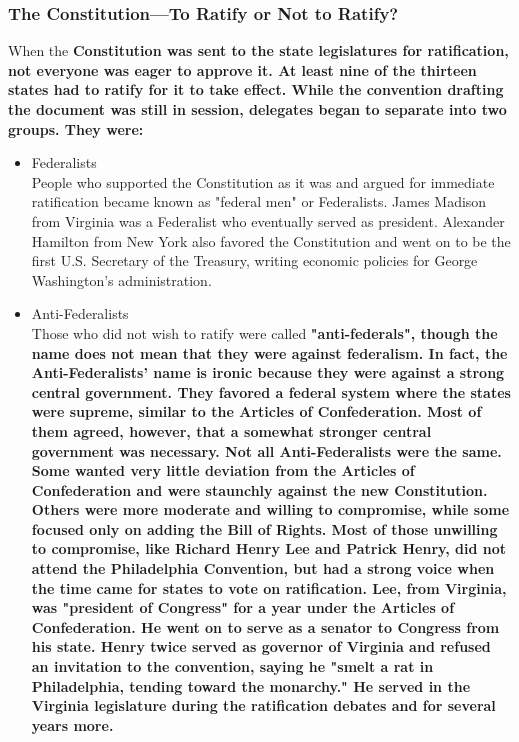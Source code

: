 
\subsubsection*{The Constitution—To Ratify or Not to Ratify?}

When the \bf{Constitution} was sent to the state legislatures for
ratification, not everyone was eager to approve it.  At least nine of the
thirteen states had to ratify for it to take effect. While the convention
drafting the document was still in session, delegates began to separate into two
groups. They were:

\begin{itemize}
    \item Federalists \\
        People who supported the Constitution as it was and argued for immediate
        ratification became known as "federal men" or Federalists. James Madison
        from Virginia was a Federalist who eventually served as president.
        Alexander Hamilton from New York also favored the Constitution and went
        on to be the first U.S. Secretary of the Treasury, writing economic
        policies for George Washington's administration.
    \item Anti-Federalists \\
        Those who did not wish to ratify were called \bf{"anti-federals"}, though the
        name does not mean that they were against federalism. In fact, the
        Anti-Federalists' name is ironic because they were against a strong
        central government. They favored a federal system where the states were
        supreme, similar to the Articles of Confederation. Most of them agreed,
        however, that a somewhat stronger central government was necessary. Not
        all Anti-Federalists were the same. Some wanted very little deviation
        from the Articles of Confederation and were staunchly against the new
        Constitution. Others were more moderate and willing to compromise, while
        some focused only on adding the Bill of Rights. Most of those unwilling
        to compromise, like Richard Henry Lee and Patrick Henry, did not attend
        the Philadelphia Convention, but had a strong voice when the time came
        for states to vote on ratification. Lee, from Virginia, was "president
        of Congress" for a year under the Articles of Confederation. He went on
        to serve as a senator to Congress from his state. Henry twice served as
        governor of Virginia and refused an invitation to the convention, saying
        he "smelt a rat in Philadelphia, tending toward the monarchy." He served
        in the Virginia legislature during the ratification debates and for
        several years more.
\end{itemize}

